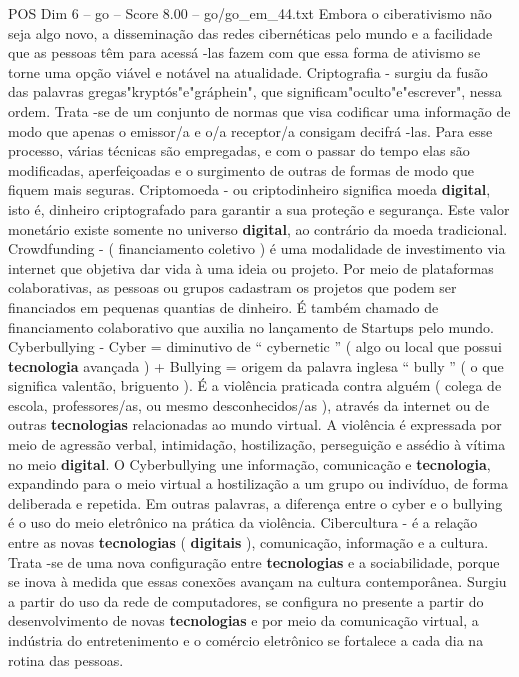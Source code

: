 \begin{textsample}{POS Dim 6 – go – Score 8.00 – go/go\_em\_44.txt}
Embora o ciberativismo não seja algo novo, a disseminação das redes cibernéticas pelo mundo e a facilidade que as pessoas têm para acessá -las fazem com que essa forma de ativismo se torne uma opção viável e notável na atualidade.
Criptografia - surgiu da fusão das palavras gregas"kryptós"e"gráphein", que significam"oculto"e"escrever", nessa ordem.
Trata -se de um conjunto de normas que visa codificar uma informação de modo que apenas o emissor/a e o/a receptor/a consigam decifrá -las.
Para esse processo, várias técnicas são empregadas, e com o passar do tempo elas são modificadas, aperfeiçoadas e o surgimento de outras de formas de modo que fiquem mais seguras.
Criptomoeda - ou criptodinheiro significa moeda \textbf{digital}, isto é, dinheiro criptografado para garantir a sua proteção e segurança.
Este valor monetário existe somente no universo \textbf{digital}, ao contrário da moeda tradicional.
Crowdfunding - ( financiamento coletivo ) é uma modalidade de investimento via internet que objetiva dar vida à uma ideia ou projeto.
Por meio de plataformas colaborativas, as pessoas ou grupos cadastram os projetos que podem ser financiados em pequenas quantias de dinheiro.
É também chamado de financiamento colaborativo que auxilia no lançamento de Startups pelo mundo.
Cyberbullying - Cyber = diminutivo de “ cybernetic ” ( algo ou local que possui \textbf{tecnologia} avançada ) + Bullying = origem da palavra inglesa “ bully ” ( o que significa valentão, briguento ).
É a violência praticada contra alguém ( colega de escola, professores/as, ou mesmo desconhecidos/as ), através da internet ou de outras \textbf{tecnologias} relacionadas ao mundo virtual.
A violência é expressada por meio de agressão verbal, intimidação, hostilização, perseguição e assédio à vítima no meio \textbf{digital}.
O Cyberbullying une informação, comunicação e \textbf{tecnologia}, expandindo para o meio virtual a hostilização a um grupo ou indivíduo, de forma deliberada e repetida.
Em outras palavras, a diferença entre o cyber e o bullying é o uso do meio eletrônico na prática da violência.
Cibercultura - é a relação entre as novas \textbf{tecnologias} ( \textbf{digitais} ), comunicação, informação e a cultura.
Trata -se de uma nova configuração entre \textbf{tecnologias} e a sociabilidade, porque se inova à medida que essas conexões avançam na cultura contemporânea.
Surgiu a partir do uso da rede de computadores, se configura no presente a partir do desenvolvimento de novas \textbf{tecnologias} e por meio da comunicação virtual, a indústria do entretenimento e o comércio eletrônico se fortalece a cada dia na rotina das pessoas.

\end{textsample}
